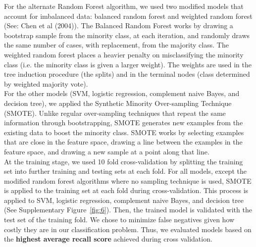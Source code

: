 \documentclass[hidelinks,10pt]{article}
\begin{document}
For the alternate Random Forest algorithm, we used two modified models that account for imbalanced data: balanced random forest and weighted random forest (See: Chen et al (2004)). The Balanced Random Forest works by drawing a bootstrap sample from the minority class, at each iteration, and randomly draws the same number of cases, with replacement, from the majority class. The weighted random forest places a heavier penalty on misclassifying the minority class (i.e. the minority class is given a larger weight). The weights are used in the tree induction procedure (the splits) and in the terminal nodes (class determined by weighted majority vote).\\
For the other models (SVM, logistic regression, complement naive Bayes, and decision tree), we applied the Synthetic Minority Over-sampling Technique (SMOTE). Unlike regular over-sampling techniques that repeat the same information through bootstrapping, SMOTE generates new examples from the existing data to boost the minority class. SMOTE works by selecting examples that are close in the feature space, drawing a line between the examples in the feature space, and drawing a new sample at a point along that line.\\
At the training stage, we used  10 fold cross-validation by splitting the training set into further training and testing sets at each fold. For all models, except the modified random forest algorithms where no sampling technique is used, SMOTE is applied to the training set at each fold during cross-validation. This process is applied to SVM, logistic regression, complement naive Bayes, and decision tree (See Supplementary Figure~\ref{fig:6}). Then, the trained model is validated with the test set of the training fold. We chose to minimize false negatives given how costly they are in our classification problem. Thus, we evaluated models based on the \textbf{highest average recall score} achieved during cross validation.

	
\end{document}
